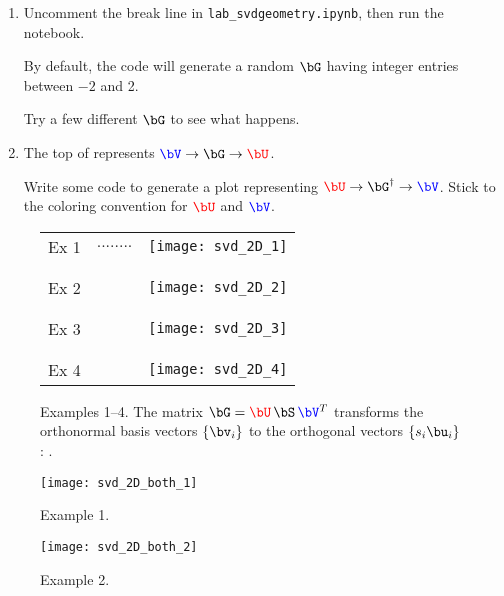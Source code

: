 \documentclass[11pt,titlepage,fleqn]{article}
\newcommand{\tfile}{{\tt lab\_svdgeometry.ipynb}}
\begin{document}
\begin{enumerate}
\item Uncomment the break line in \tfile, then run the notebook.

By default, the code will generate a random $\bG$ having integer entries between $-2$ and 2.

Try a few different $\bG$ to see what happens.

\item The top of  represents $\Vcolor \rightarrow \bG \rightarrow \Ucolor$.

Write some code to generate a plot representing $\Ucolor \rightarrow \bG^{\dagger} \rightarrow \Vcolor$. Stick to the coloring convention for $\Ucolor$ and $\Vcolor$.

\end{enumerate}



\setcounter{figure}{-1}

\clearpage\pagebreak
\pagestyle{empty}
\begin{figure}
\centering
\begin{tabular}{rcc}
Ex 1 & $........$ & \texttt{[image: svd\_2D\_1]} \\ \\ \\
Ex 2 & &\texttt{[image: svd\_2D\_2]} \\ \\ \\
Ex 3 & &\texttt{[image: svd\_2D\_3]} \\ \\ \\
Ex 4 & &\texttt{[image: svd\_2D\_4]} 
\end{tabular}
\caption[]
{{
Examples 1--4.
The matrix $\bG = \Ucolor\,\bS\,\Vcolor^T$ transforms the orthonormal basis vectors \textcolor{blue}{$\{\bv_i\}$} to the orthogonal vectors \textcolor{red}{$\{s_i\bu_i\}$}: \makebox{$\bG\Vcolor = \Ucolor\,\bS$}.
\label{fig:2D}
}}
\end{figure}

\clearpage\pagebreak
\begin{figure}
\hspace{-1cm}
\texttt{[image: svd\_2D\_both\_1]}
\caption[]
{{
Example 1.
\label{fig:ex1}
}}
\end{figure}

\clearpage\pagebreak
\begin{figure}
\hspace{-1cm}
\texttt{[image: svd\_2D\_both\_2]}
\caption[]
{{
Example 2.
\label{fig:ex2}
}}
\end{figure}
\end{document}
